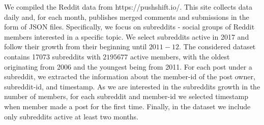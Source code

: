 

We compiled the Reddit data from https://pushshift.io/. This site collects data daily and, for each month, publishes merged comments and submissions in the form of JSON files. 
Specifically, we focus on subreddits - social groups of Reddit members interested in a specific topic. 
We select subreddits active in 2017 and follow their growth from their beginning until $2011-12$. The considered dataset contains 17073 subreddits with $2 195 677$ active members, with the oldest originating from 2006 and the youngest being from 2011. For each post under a subreddit, we extracted the information about the member-id of the post owner, subreddit-id, and timestamp. As we are interested in the subreddits growth in the number of members, for each subreddit and member-id we selected timestamp when member made a post for the first time. Finally, in the dataset we include only subreddits active at least two months.  


